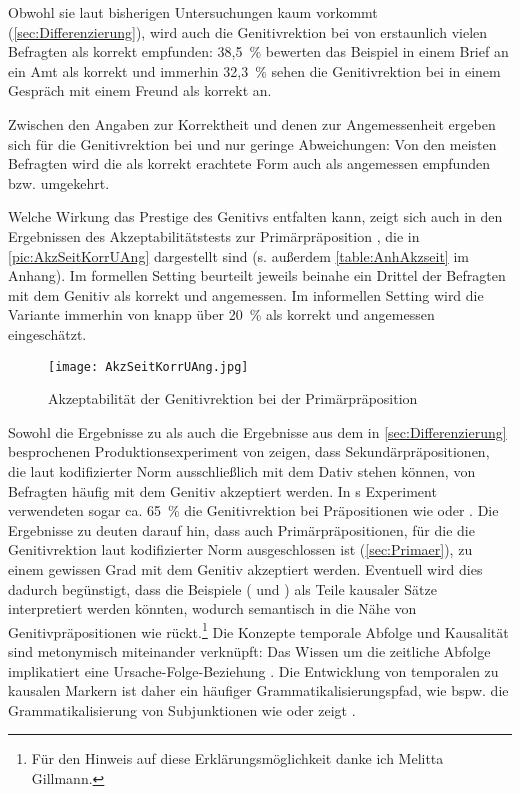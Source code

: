 Obwohl sie laut bisherigen Untersuchungen kaum vorkommt (\autoref{sec:Differenzierung}), wird auch die Genitivrektion bei \gegenueber{} von erstaunlich vielen Befragten als korrekt empfunden:  38,5~\% bewerten  das Beispiel  in einem Brief an ein Amt als korrekt und immerhin 32,3~\% sehen die Genitivrektion bei  in einem Gespräch mit einem Freund als korrekt an.

Zwischen den Angaben zur Korrektheit und denen zur Angemessenheit ergeben sich für die Genitivrektion bei \dank{} und \gegenueber{} nur geringe Abweichungen: 
Von den meisten Befragten wird die als korrekt erachtete Form auch als angemessen empfunden bzw. umgekehrt. 

Welche Wirkung das Prestige des Genitivs entfalten kann, zeigt sich auch in den Ergebnissen des Akzeptabilitätstests zur Primärpräposition , die in \autoref{pic:AkzSeitKorrUAng} dargestellt sind (s. außerdem \autoref{table:AnhAkzseit} im Anhang). 
Im formellen Setting beurteilt jeweils beinahe ein Drittel der Befragten  mit dem Genitiv als korrekt und angemessen. 
Im informellen Setting wird die Variante immerhin von knapp über 20~\% als korrekt und angemessen eingeschätzt. 
\begin{figure}
\centering
\texttt{[image: AkzSeitKorrUAng.jpg]}
\caption{Akzeptabilität der Genitivrektion bei der Primärpräposition }
\label{pic:AkzSeitKorrUAng}
\end{figure}

Sowohl die Ergebnisse zu \gegenueber{} als auch die Ergebnisse aus dem in \autoref{sec:Differenzierung} besprochenen Produktionsexperiment von \citet{Becker2011} zeigen, dass Sekundärpräpositionen, die laut kodifizierter Norm ausschließlich mit dem Dativ stehen können, von Befragten häufig mit dem Genitiv akzeptiert werden. 
In \citeauthor{Becker2011}s Experiment verwendeten sogar ca. 65~\% die Genitivrektion bei Präpositionen wie  oder  \citep[s.][210]{Becker2011}. 
Die Ergebnisse zu  deuten darauf hin, dass auch Primärpräpositionen, für die die Genitivrektion laut kodifizierter Norm ausgeschlossen ist (\autoref{sec:Primaer}), zu einem gewissen Grad mit dem Genitiv akzeptiert werden. 
Eventuell wird dies dadurch begünstigt, dass die Beispiele ( und ) als Teile kausaler Sätze interpretiert werden könnten, wodurch  semantisch in die Nähe von Genitivpräpositionen wie \wegen{} rückt.\footnote{Für den Hinweis auf diese Erklärungsmöglichkeit danke ich Melitta Gillmann.}
Die Konzepte \glq temporale Abfolge\grq{} und \glq Kausalität\grq{} sind metonymisch miteinander verknüpft: Das Wissen um die zeitliche Abfolge implikatiert eine Ursache-Folge-Beziehung \citep[s.][]{Traugott.1991}.
Die Entwicklung von temporalen zu kausalen Markern ist daher ein häufiger Grammatikalisierungspfad, wie bspw. die Grammatikalisierung von Subjunktionen wie  oder  zeigt \citep[s.][]{Gillmann.2018}. 

